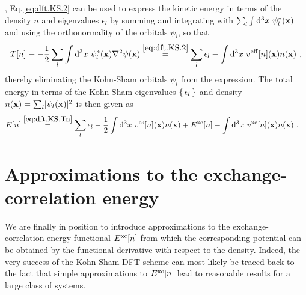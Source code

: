 , Eq.\,\eqref{eq:dft.KS.2} can be used to express the kinetic energy in terms of the density $n$ and eigenvalues $\epsilon_l$ by summing and integrating with $\sum_l \int {\rm d}^3 x~\psi^\ast_l ({\bf x})$ and using the orthonormality of the orbitals $\psi_l$, so that
\begin{align}
	T[n] 
		\equiv - \frac{1}{2}\sum_l \int \d^3 x ~ \psi^\ast_l ({\bf x}) \nabla^2 \psi({\bf x})
		\stackrel{\eqref{eq:dft.KS.2}}{=} 
			\sum_l \epsilon_l 
			- \int \d^3 x ~ v^{\rm eff}[n] ({\bf x}) n({\bf x})~,
	\label{eq:dft.KS.Tn}
\end{align}
thereby eliminating the Kohn-Sham orbitals $\psi_l$ from the expression.
The total energy in terms of the Kohn-Sham eigenvalues $\set{\epsilon_l}$ and density $n ({\bf x}) = \sum_l \lvert \psi_l ({\bf x}) \rvert^2$ is then given as
\begin{align}
	E[n]
		&\stackrel{\eqref{eq:dft.KS.Tn}}{=}
			\sum_l \epsilon_l 
			- \frac{1}{2} \int \d^3 x ~ v^{\rm es} [n] ({\bf x}) n ({\bf x})
			+ E^{\rm xc}[n]
			- \int \d^3 x ~ v^{\rm xc}[n] ({\bf x}) n ({\bf x})~.
	\label{eq:dft.KS.En}
\end{align}

\section{Approximations to the exchange-correlation energy}
\label{sec:dft.approximations}
We are finally in position to introduce approximations to the exchange-correlation energy functional $E^{\rm xc}[n]$ from which the corresponding potential can be obtained by the functional derivative with respect to the density. Indeed, the very success of the Kohn-Sham DFT scheme can most likely be traced back to the fact that simple approximations to $E^{\rm xc}[n]$ lead to reasonable results for a large class of systems. 

